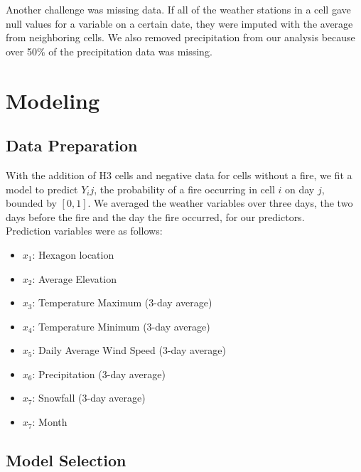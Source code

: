 \documentclass[
  12pt,
  letterpaper,
  DIV=11,
  numbers=noendperiod]{scrartcl}
\providecommand{\tightlist}{%
  \setlength{\itemsep}{0pt}\setlength{\parskip}{0pt}}\usepackage{longtable,booktabs,array}
\begin{document}
Another challenge was missing data. If all of the weather stations in a
cell gave null values for a variable on a certain date, they were
imputed with the average from neighboring cells. We also removed
precipitation from our analysis because over 50\% of the precipitation
data was missing.

\section{Modeling}\label{modeling}

\subsection{Data Preparation}\label{data-preparation}

With the addition of H3 cells and negative data for cells without a
fire, we fit a model to predict \(Y_ij\), the probability of a fire
occurring in cell \(i\) on day \(j\), bounded by \([0,1]\). We averaged
the weather variables over three days, the two days before the fire and
the day the fire occurred, for our predictors.\\
Prediction variables were as follows:

\begin{itemize}
\tightlist
\item
  \(x_1\): Hexagon location\\
\item
  \(x_2\): Average Elevation\\
\item
  \(x_3\): Temperature Maximum (3-day average)\\
\item
  \(x_4\): Temperature Minimum (3-day average)\\
\item
  \(x_5\): Daily Average Wind Speed (3-day average)\\
\item
  \(x_6\): Precipitation (3-day average)\\
\item
  \(x_7\): Snowfall (3-day average)\\
\item
  \(x_7\): Month
\end{itemize}

\subsection{Model Selection}\label{model-selection}
\end{document}
